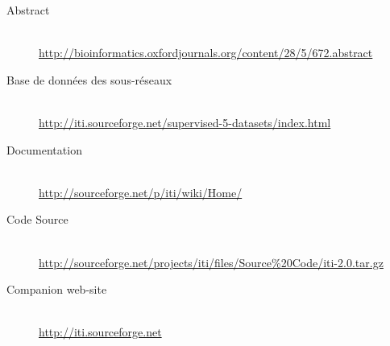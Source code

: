         \begin{description}
          \item [Abstract]    \hfill \\
            \url{http://bioinformatics.oxfordjournals.org/content/28/5/672.abstract}
          \item [Base de données des sous-réseaux]    \hfill \\
            \url{http://iti.sourceforge.net/supervised-5-datasets/index.html}
          \item [Documentation]                       \hfill \\
            \url{http://sourceforge.net/p/iti/wiki/Home/}
          \item [Code Source]                         \hfill \\
            \url{http://sourceforge.net/projects/iti/files/Source%20Code/iti-2.0.tar.gz}
          \item [Companion web-site]    \hfill \\
            \url{http://iti.sourceforge.net}
        \end{description}

    
